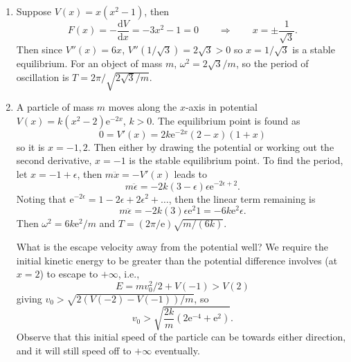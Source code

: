 \documentclass[letter-paper]{tufte-book}
\newenvironment{example}[1][Example]{\begin{trivlist}
\item[\hskip \labelsep {\bfseries #1}]}{\end{trivlist}}
\newcommand{\ex}{\mathrm{e}}
\begin{document}
\begin{example}
\begin{enumerate}
  \item Suppose $V(x) = x(x^2 - 1)$, then
  \begin{equation*}
    F(x) = -\frac{\mathrm{d}V}{\mathrm{d}x} = -3x^2 - 1 = 0 \qquad \Rightarrow
    \qquad x = \pm\frac{1}{\sqrt{3}}.
  \end{equation*}
  Then since $V''(x) = 6x$, $V''(1/\sqrt{3}) = 2\sqrt{3} > 0$ so $x =
  1/\sqrt{3}$ is a stable equilibrium. For an object of mass $m$, $\omega^2 =
  2\sqrt{3}/m$, so the period of oscillation is $T = 2\pi / \sqrt{2\sqrt{3}/m}$.
  
  \item A particle of mass $m$ moves along the $x$-axis in potential $V(x) =
  k(x^2 - 2) \ex^{-2x}$, $k > 0$. The equilibrium point is found as
  \begin{equation*}
    0 = V'(x) = 2k\ex^{-2x}(2-x)(1+x)
  \end{equation*}
  so it is $x = -1, 2$. Then either by drawing the potential or working out the
  second derivative, $x=-1$ is the stable equilibrium point. To find the period,
  let $x = -1 + \epsilon$, then $m\ddot{x} = -V'(x)$ leads to
  \begin{equation*}
    m\ddot{\epsilon} = -2k(3-\epsilon)\epsilon \ex^{-2\epsilon + 2}.
  \end{equation*}
  Noting that $\ex^{-2\epsilon} = 1 - 2\epsilon + 2\epsilon^2+\ldots$, then the
  linear term remaining is
  \begin{equation*}
    m\ddot{\epsilon} = -2k(3)\epsilon\ex^2 1 = -6k\ex^2 \epsilon.
  \end{equation*}
  Then $\omega^2 = 6k\ex^2 / m$ and $T = (2\pi/\ex)\sqrt{m/(6k)}$.
  
  What is the escape velocity away from the potential well? We require the
  initial kinetic energy to be greater than the potential difference involves
  (at $x=2$) to escape to $+\infty$, i.e.,
  \begin{equation*}
    E = mv_0^2 / 2 + V(-1) > V(2)
  \end{equation*}
  giving $v_0 > \sqrt{2(V(-2) - V(-1))/m}$, so
  \begin{equation*}
    v_0 > \sqrt{\frac{2k}{m}(2\ex^{-4} + \ex^2)}.
  \end{equation*}
  Observe that this initial speed of the particle can be towards either
  direction, and it will still speed off to $+\infty$ eventually.
\end{enumerate}
\end{example}
\end{document}
